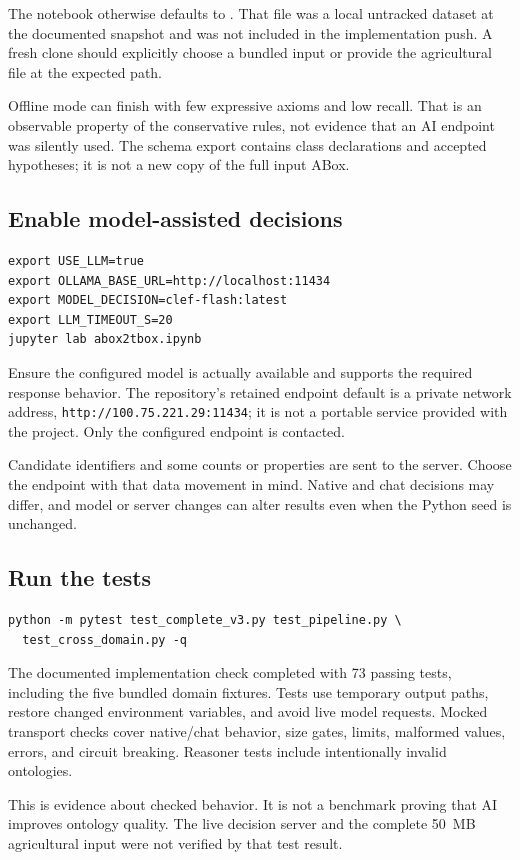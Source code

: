 \documentclass[11pt,a4paper]{article}
\newcommand{\code}[1]{\nolinkurl{#1}}
\newcommand{\file}[1]{\path{#1}}
\begin{document}
The notebook otherwise defaults to \file{input/agriAbox.ttl}. That file was a
local untracked dataset at the documented snapshot and was not included in the
implementation push. A fresh clone should explicitly choose a bundled input or
provide the agricultural file at the expected path.

Offline mode can finish with few expressive axioms and low recall. That is an
observable property of the conservative rules, not evidence that an AI endpoint
was silently used. The schema export contains class declarations and accepted
hypotheses; it is not a new copy of the full input ABox.

\subsection{Enable model-assisted decisions}
\begin{lstlisting}
export USE_LLM=true
export OLLAMA_BASE_URL=http://localhost:11434
export MODEL_DECISION=clef-flash:latest
export LLM_TIMEOUT_S=20
jupyter lab abox2tbox.ipynb
\end{lstlisting}
Ensure the configured model is actually available and supports the required
response behavior. The repository's retained endpoint default is a private
network address, \code{http://100.75.221.29:11434}; it is not a portable service
provided with the project. Only the configured endpoint is contacted.

Candidate identifiers and some counts or properties are sent to the server.
Choose the endpoint with that data movement in mind. Native and chat decisions
may differ, and model or server changes can alter results even when the Python
seed is unchanged.

\subsection{Run the tests}
\begin{lstlisting}
python -m pytest test_complete_v3.py test_pipeline.py \
  test_cross_domain.py -q
\end{lstlisting}
The documented implementation check completed with 73 passing tests, including
the five bundled domain fixtures. Tests use temporary output paths, restore
changed environment variables, and avoid live model requests. Mocked transport
checks cover native/chat behavior, size gates, limits, malformed values, errors,
and circuit breaking. Reasoner tests include intentionally invalid ontologies.

This is evidence about checked behavior. It is not a benchmark proving that AI
improves ontology quality. The live decision server and the complete 50~MB
agricultural input were not verified by that test result.
\end{document}

